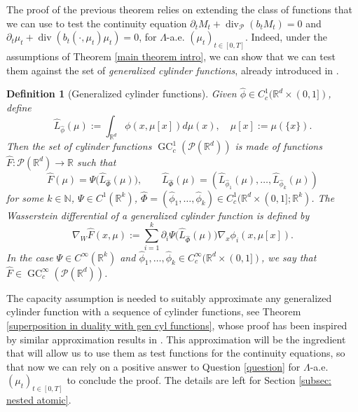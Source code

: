 \documentclass[10pt,leqno]{amsart}
\numberwithin{equation}{section}
\newtheorem{df}[teorema]{Definition}
\newcommand{\R}{\mathbb{R}}
\newcommand{\N}{\mathbb{N}}
\newcommand{\PP}{\mathcal{P}}
\begin{document}
The proof of the previous theorem relies on extending the class of functions that we can use to test the continuity equation $\partial_tM_t + \operatorname{div}_\PP(b_tM_t) = 0$ and $\partial_t\mu_t + \operatorname{div}(b_t(\cdot,\mu_t)\mu_t) = 0$, for $\Lambda$-a.e. $(\mu_t)_{t\in[0,T]}$. Indeed, under the assumptions of Theorem \ref{main theorem intro}, we can show that we can test them against the set of \textit{generalized cylinder functions}, already introduced in \cite{dello2022dirichlet,delloschiavo2024massive}.

\begin{df}[Generalized cylinder functions]\label{def: GC functions}
    Given $\hat{\phi}\in C_c^1(\R^d\times (0,1])$, define
    \[\hat{L}_{\hat{\phi}}(\mu) := \int_{\R^d} \phi(x,\mu[x]) d\mu(x), \quad \mu[x]:= \mu(\{x\}).\]
    Then the set of cylinder functions $\operatorname{GC}_c^1(\PP(\R^d))$ is made of functions $\hat{F}:\PP(\R^d)\to \R$ such that 
    \begin{equation}\label{gen cyl functions}
        \hat{F}(\mu) = \Psi\big(\hat{L}_{\hat{\Phi}}(\mu)\big), \qquad \hat{L}_{\hat{\Phi}}(\mu) = \left( \hat{L}_{\hat{\phi}_1}(\mu),\dots, \hat{L}_{\hat{\phi}_k}(\mu) \right)
    \end{equation}
    for some $k\in \N$, $\Psi\in C^1(\R^k)$, $\hat{\Phi} = (\hat{\phi}_1,\dots,\hat{\phi}_k) \in C^1_c(\R^d\times(0,1];\R^k)$. 
    The Wasserstein differential of a generalized cylinder function is defined by 
    \begin{equation}
        \nabla_W \hat{F}(x,\mu) := \sum_{i=1}^k \partial_i \Psi\big(\hat{L}_{\hat{\Phi}}(\mu)\big) \nabla_x \phi_i(x,\mu[x]). 
    \end{equation}
    In the case $\Psi \in C^\infty(\R^k)$ and $\hat{\phi}_1,\dots,\hat{\phi}_k \in C_c^\infty(\R^d \times (0,1])$, we say that $\hat{F}\in \operatorname{GC}_c^\infty(\PP(\R^d))$.
\end{df}

The capacity assumption is needed to suitably approximate any generalized cylinder function with a sequence of cylinder functions, see Theorem \ref{superposition in duality with gen cyl functions}, whose proof has been inspired by similar approximation results in \cite{dello2022dirichlet, delloschiavo2024massive}. This approximation will be the ingredient that will allow us to use them as test functions for the continuity equations, so that now we can rely on a positive answer to Question \eqref{question} for $\Lambda$-a.e. $(\mu_t)_{t\in [0,T]}$ to conclude the proof. The details are left for Section \ref{subsec: nested atomic}.
\end{document}
